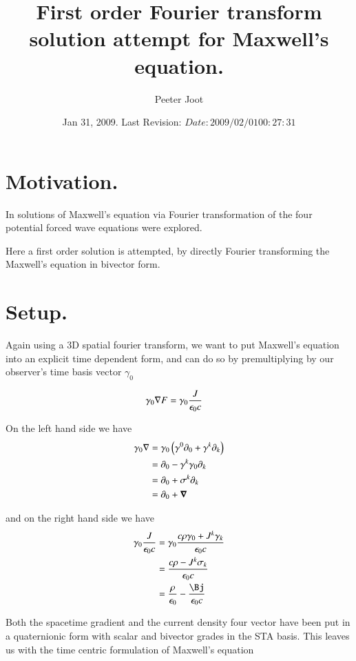\documentclass{article}
\title{ First order Fourier transform solution attempt for Maxwell's equation. }
\author{Peeter Joot}
\date{ Jan 31, 2009.  Last Revision: $Date: 2009/02/01 00:27:31 $ }
\begin{document}
\maketitle{}

\tableofcontents

\section{ Motivation. }

In \cite{PJfourierMaxwellSecondOrder} solutions of Maxwell's equation
via Fourier transformation of the four potential forced wave equations were
explored.

Here a first order solution is attempted, by directly Fourier transforming
the Maxwell's equation in bivector form.

\section{ Setup. }

Again using a 3D spatial fourier transform, we want to put Maxwell's equation into an explicit time dependent form, and can do so by
premultiplying by our observer's time basis vector $\gamma_0$

\begin{align*}
\gamma_0 \nabla F &= \gamma_0 \frac{J }{\epsilon_0 c}
\end{align*}

On the left hand side we have
\begin{align*}
\gamma_0 \nabla 
&= \gamma_0 \left( \gamma^0 \partial_0 + \gamma^k \partial_k \right) \\
&= \partial_0 - \gamma^k \gamma_0 \partial_k \\
&= \partial_0 + \sigma^k \partial_k \\
&= \partial_0 + \boldsymbol{\nabla} \\
\end{align*}

and on the right hand side we have
\begin{align*}
\gamma_0 \frac{J }{\epsilon_0 c}
&= \gamma_0 \frac{c \rho \gamma_0 + J^k \gamma_k }{\epsilon_0 c} \\
&= \frac{c \rho - J^k \sigma_k }{\epsilon_0 c} \\
&= \frac{\rho}{\epsilon_0} - \frac{\Bj}{\epsilon_0 c} \\
\end{align*}

Both the spacetime gradient and the current density four vector have been put in a quaternionic form with scalar and bivector grades in the 
STA basis.  This leaves us with the time centric formulation of Maxwell's equation
\end{document}
